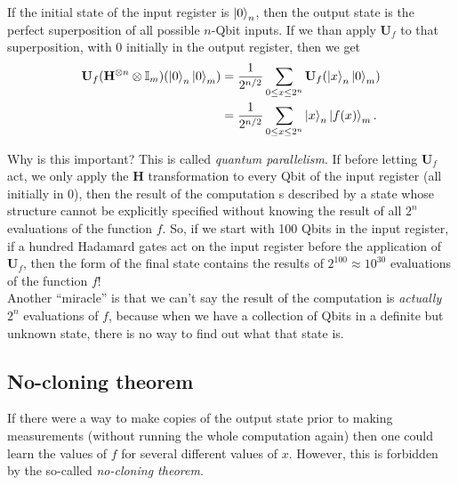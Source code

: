 \documentclass{book}
\theoremstyle{definition}
\newcommand{\nn}{\nonumber}
\newcommand{\f}[2]{\frac{#1}{#2}}
\newcommand{\Id}{\mathbb{I}}
\newcommand{\had}{\mathbf{H}}
\begin{document}
If the initial state of the input register is $\ket{0}_n$, then the output state is the perfect superposition of all possible $n$-Qbit inputs. If we than apply $\mathbf{U}_f$ to that superposition, with $0$ initially in the output register, then we get
\begin{align}
\mathbf{U}_f (\had^{\otimes n} \otimes \Id_m)(\ket{0}_n\ket{0}_m) &= \f{1}{2^{n/2}}\sum_{0\leq x\leq 2^n} \mathbf{U}_f (\ket{x}_n \ket{0}_m)\nn\\
&= \f{1}{2^{n/2}} \sum_{0\leq x\leq 2^n} \ket{x}_n \ket{f(x)}_m.
\end{align}

Why is this important? This is called \textit{quantum parallelism}. If before letting $\mathbf{U}_f$ act, we only apply the $\had$ transformation to every Qbit of the input register (all initially in 0), then the result of the computation s described by a state whose structure cannot be explicitly specified without knowing the result of all $2^n$ evaluations of the function $f$. So, if we start with 100 Qbits in the input register, if a hundred Hadamard gates act on the input register before the application of $\mathbf{U}_f$, then the form of the final state contains the results of $2^{100} \approx 10^{30}$ evaluations of the function $f$! \\

Another ``miracle'' is that we can't say the result of the computation is \textit{actually} $2^n$ evaluations of $f$, because when we have a collection of Qbits in a definite but unknown state, there is no way to find out what that state is.



\subsection{No-cloning theorem}

If there were a way to make copies of the output state prior to making measurements (without running the whole computation again) then one could learn the values of $f$ for several different values of $x$. However, this is forbidden by the so-called \textit{no-cloning theorem}. \\
\end{document}
